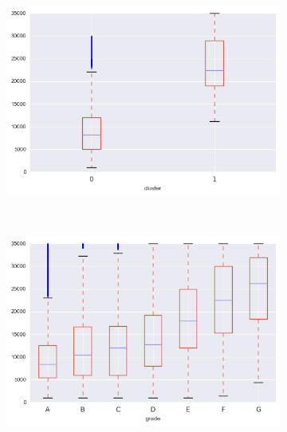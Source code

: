 \begin{anexosenv}
\begin{figure}[t!]
\begin{subfigure}[t]{0.5\textwidth}
            \centerline{\includegraphics[width=1.05\textwidth]{img/funded_amnt_by_cluster}}
        \end{subfigure}%
        ~ 
        \begin{subfigure}[t]{0.5\textwidth}
            \centering
   
            \centerline{\includegraphics[width=1.05\textwidth]{img/funded_amnt_by_grade}}

        \end{subfigure}

\end{figure}

\begin{figure}[t!]
    \centering
        \caption{funded\textunderscore amnt\textunderscore inv }
        \begin{subfigure}[t]{0.5\textwidth}
 

\end{subfigure}
\end{figure}
\end{anexosenv}
